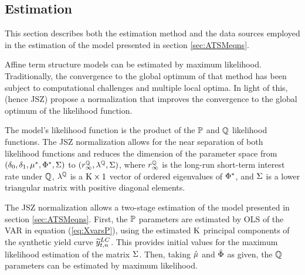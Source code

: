 {\subsection{Estimation} \label{sec:Estimation}
This section describes both the estimation method and the data sources employed in the estimation of the model presented in section \ref{sec:ATSMeqns}.

Affine term structure models can be estimated by maximum likelihood. Traditionally, the convergence to the global optimum of that method has been subject to computational challenges and multiple local optima. In light of this, \citet*{JSZ:2011} (hence JSZ) propose a normalization that improves the convergence to the global optimum of the likelihood function.

The model's likelihood function is the product of the $\mathbb{P}$ and $\mathbb{Q}$ likelihood functions. The JSZ normalization allows for the near separation of both likelihood functions and reduces the dimension of the parameter space from $(\delta_{0}, \delta_{1}, \mu^{*}, \Phi^{*}, \Sigma)$ to $(r^{\mathbb{Q}}_{\infty}, \lambda^{\mathbb{Q}},\Sigma)$, where $r^{\mathbb{Q}}_{\infty}$ is the long-run short-term interest rate under $\mathbb{Q}$, $\lambda^{\mathbb{Q}}$ is a $\mathrm{K} \times 1$ vector of ordered eigenvalues of $\Phi^{*}$, and $\Sigma$ is a lower triangular matrix with positive diagonal elements.

The JSZ normalization allows a two-stage estimation of the model presented in section \ref{sec:ATSMeqns}. First, the $\mathbb{P}$ parameters are estimated by OLS of the VAR in equation (\ref{eq:XvarsP}), using the estimated $\mathrm{K}$ principal components of the synthetic yield curve $\widetilde{y}_{t,n} ^{LC}$. This provides initial values for the maximum likelihood estimation of the matrix $\Sigma$. Then, taking $\hat{\mu}$ and $\hat{\Phi}$ as given, the $\mathbb{Q}$ parameters can be estimated by maximum likelihood.


}
